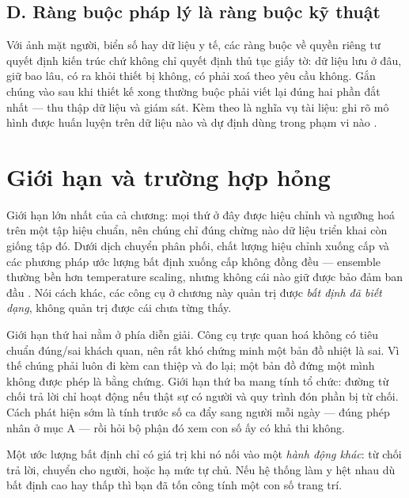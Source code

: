 \documentclass[../../deep_learning.tex]{subfiles}
\begin{document}
\subsection{D. Ràng buộc pháp lý là ràng buộc kỹ thuật}
Với ảnh mặt người, biển số hay dữ liệu y tế, các ràng buộc về quyền riêng tư quyết định kiến trúc chứ không chỉ quyết định thủ tục giấy tờ: dữ liệu lưu ở đâu, giữ bao lâu, có ra khỏi thiết bị không, có phải xoá theo yêu cầu không. Gắn chúng vào sau khi thiết kế xong thường buộc phải viết lại đúng hai phần đắt nhất --- thu thập dữ liệu và giám sát. Kèm theo là nghĩa vụ tài liệu: ghi rõ mô hình được huấn luyện trên dữ liệu nào và dự định dùng trong phạm vi nào \cite{mitchell2019model}.

\section{Giới hạn và trường hợp hỏng}
Giới hạn lớn nhất của cả chương: mọi thứ ở đây được hiệu chỉnh và ngưỡng hoá trên một tập hiệu chuẩn, nên chúng chỉ đúng chừng nào dữ liệu triển khai còn giống tập đó. Dưới dịch chuyển phân phối, chất lượng hiệu chỉnh xuống cấp và các phương pháp ước lượng bất định xuống cấp không đồng đều --- ensemble thường bền hơn temperature scaling, nhưng không cái nào giữ được bảo đảm ban đầu \cite{ovadia2019can}. Nói cách khác, các công cụ ở chương này quản trị được \emph{bất định đã biết dạng}, không quản trị được cái chưa từng thấy.

Giới hạn thứ hai nằm ở phía diễn giải. Công cụ trực quan hoá không có tiêu chuẩn đúng/sai khách quan, nên rất khó chứng minh một bản đồ nhiệt là sai. Vì thế chúng phải luôn đi kèm can thiệp và đo lại; một bản đồ đứng một mình không được phép là bằng chứng. Giới hạn thứ ba mang tính tổ chức: đường từ chối trả lời chỉ hoạt động nếu thật sự có người và quy trình đón phần bị từ chối. Cách phát hiện sớm là tính trước số ca đẩy sang người mỗi ngày --- đúng phép nhân ở mục A --- rồi hỏi bộ phận đó xem con số ấy có khả thi không.

\begin{cannho}
Một ước lượng bất định chỉ có giá trị khi nó nối vào một \emph{hành động khác}: từ chối trả lời, chuyển cho người, hoặc hạ mức tự chủ. Nếu hệ thống làm y hệt nhau dù bất định cao hay thấp thì bạn đã tốn công tính một con số trang trí. 
\end{cannho}
\end{document}

